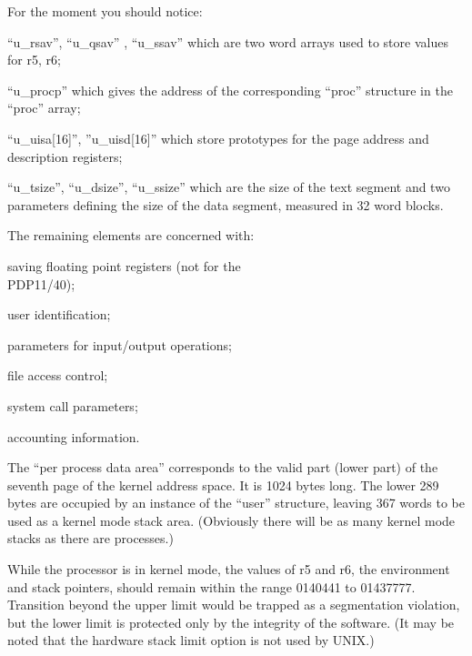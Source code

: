 For the moment you should notice:

\bd
\item[(a)] ``u\_rsav'', ``u\_qsav'' , ``u\_ssav''
 which are two word arrays used
 to store values for r5, r6;

\item[(b)] ``u\_procp'' which gives the
 address of the corresponding
 ``proc'' structure in the ``proc''
 array;

\item[(c)] ``u\_uisa[16]'', ''u\_uisd[16]'' which
 store prototypes for the page
 address and description registers;

\item[(d)] ``u\_tsize'', ``u\_dsize'', ``u\_ssize''
 which are the size of the text
 segment and two parameters
 defining the size of the data
 segment, measured in 32 word
 blocks.
\ed

\noindent The remaining elements are concerned
with:

\bi
\item saving floating point registers
 (not for the\\
PDP11/40);

\item user identification;

\item parameters for input/output operations;

\item file access control;

\item system call parameters;

\item accounting information.
\ei


The ``per process data area'' corresponds
to the valid part (lower part) of the
seventh page of the kernel address
space. It is 1024 bytes long. The lower
289 bytes are occupied by an instance
of the ``user'' structure, leaving 367
words to be used as a kernel mode stack
area. (Obviously there will be as many
kernel mode stacks as there are
processes.)

While the processor is in kernel mode,
the values of r5 and r6, the environment and stack pointers, should remain
within the range 0140441 to 01437777.
Transition beyond the upper limit would
be trapped as a segmentation violation,
but the lower limit is protected only
by the integrity of the software. (It
may be noted that the hardware stack
limit option is not used by UNIX.)

